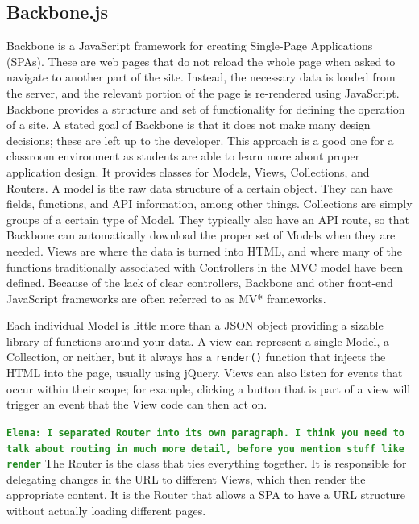 \documentclass[12pt]{article}
\newcommand{\comment}[1]{{\bf \tt  {#1}}}
\newcommand{\emcomment}[1]{\textcolor{ForestGreen}{\comment{Elena: {#1}}}}
\newcommand{\code}[1]{{\texttt {#1}}}
\begin{document}

\subsection{Backbone.js}\label{sec:backbone}
Backbone is a JavaScript framework for creating Single-Page Applications (SPAs). These are web pages that do not reload the whole page when asked to navigate to another part of the site. Instead, the necessary data is loaded from the server, and the relevant portion of the page is re-rendered using JavaScript. Backbone provides a structure and set of functionality for defining the operation of a site. A stated goal of Backbone is that it does not make many design decisions; these are left up to the developer. This approach is a good one for a classroom environment as students are able to learn more about proper application design. It provides classes for Models, Views, Collections, and Routers. A model is the raw data structure of a certain object. They can have fields, functions, and API information, among other things. Collections are simply groups of a certain type of Model. They typically also have an API route, so that Backbone can automatically download the proper set of Models when they are needed. Views are where the data is turned into HTML, and where many of the functions traditionally associated with Controllers in the MVC model have been defined. Because of the lack of clear controllers, Backbone and other front-end JavaScript frameworks are often referred to as MV* frameworks. 

Each individual Model is little more than a JSON object providing a sizable library of functions around your data. A view can represent a single Model, a Collection, or neither, but it always has a \code{render()} function that injects the HTML into the page, usually using jQuery. Views can also listen for events that occur within their scope; for example, clicking a button that is part of a view will trigger an event that the View code can then act on. 

\emcomment{I separated Router into its own paragraph. I think you need to talk about routing in much more detail, before you mention stuff like \code{render}}
The Router is the class that ties everything together. It is responsible for delegating changes in the URL to different Views, which then render the appropriate content. It is the Router that allows a SPA to have a URL structure without actually loading different pages.
\end{document}
